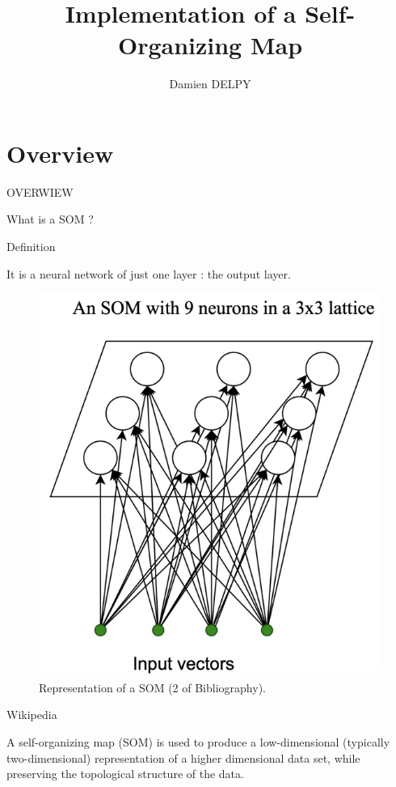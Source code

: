\documentclass{beamer}
\author{Damien DELPY}
\title{Implementation of a Self-Organizing Map}
\institute{ENSEIRB-MATMECA}
\begin{document}
\begin{frame}
	
	\titlepage
\end{frame}


\begin{frame}

	\tableofcontents[sectionstyle=show,subsectionstyle=show/shaded/hide,subsectionstyle=show/shaded/hide]
\end{frame}



\section{Overview}
	
	\begin{frame}

		\begin{center}
			
			\Huge OVERWIEW
		\end{center}
	\end{frame}


	\begin{frame}{What is a SOM ?}
		
		\begin{block}{Definition}
 
It is a neural network of just one layer : the output layer.
 	
			
		\begin{center}
			
			\begin{figure}[h]
			
				\includegraphics[width=0.3\linewidth]{pics/som_example_diapo_1.png}
				\caption{Representation of a SOM (2 of Bibliography).}
			\end{figure}
		\end{center}

		\end{block}		

		\begin{block}{Wikipedia}

A self-organizing map (SOM) is used to produce a low-dimensional (typically two-dimensional) representation of a higher dimensional data set, while preserving the topological structure of the data. 
		\end{block}
	\end{frame}
	
\end{document}
